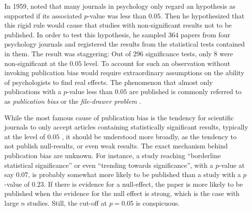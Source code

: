 In 1959, \citeauthor{Sterling1959-cq} noted that many journals in psychology only regard an hypothesis as supported if its associated $p$-value was less than $0.05$. Then he hypothesized that this rigid rule would cause that studies with non-significant results not to be published. In order to test this hypothesis, he sampled $364$ papers from four psychology journals and registered the results from the statistical tests contained in them. The result was staggering: Out of $296$ significance tests, only $8$ were non-significant at the $0.05$ level. To account for such an observation without invoking publication bias would require extraordinary assumptions on the ability of psychologists to find real effects. The phenomenon that almost only publications with a $p$-value less than $0.05$ are published is commonly referred to as \emph{publication bias} or the \emph{file-drawer
problem} \parencite{rosenthal_file_1979}.

While the most famous cause of publication bias is the tendency for scientific journals to only accept articles containing statistically significant results, typically at the level of $0.05$ \parencite{simmons_false-positive_2011}, it should be understood more broadly, as the tendency to not publish null-results, or even weak results. The exact mechanism behind publication bias are unknown. For instance, a study reaching ``borderline statistical significance'' or even ``trending towards significance'', with a $p$-value at say $0.07$, is probably somewhat more likely to be published than a study with a $p$-value of $0.23$. If there is evidence for a null-effect, the paper is more likely to be published when the evidence for the null effect is strong, which is the case with large $n$ studies. Still, the cut-off at $p = 0.05$ is conspicuous. 

